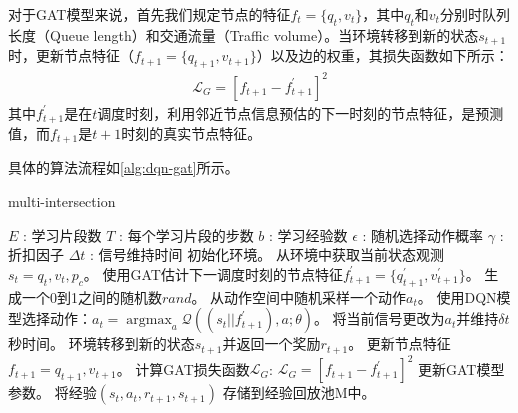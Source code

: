 对于GAT模型来说，首先我们规定节点的特征$f_t=\{q_t, v_t\}$，其中$q_t$和$v_t$分别时队列长度（Queue length）和交通流量（Traffic volume）。当环境转移到新的状态$s_{t+1}$时，更新节点特征（$f_{t+1}=\{q_{t+1},v_{t+1}\}$）以及边的权重，其损失函数如下所示：
\begin{align}
  \label{eq:loss-gat}
  \mathcal{L}_G = [f_{t+1} - f_{t+1}^{\prime}]^2
\end{align}
其中$f_{t+1}^{\prime}$是在$t$调度时刻，利用邻近节点信息预估的下一时刻的节点特征，是预测值，而$f_{t+1}$是$t+1$时刻的真实节点特征。

具体的算法流程如\autoref{alg:dqn-gat}所示。
\begin{breakablealgorithm}
  \caption{multi-intersection}
  \label{alg:dqn-gat}
  \begin{algorithmic}[1] %
      \Require 
      $E$ : 学习片段数 \newline
      $T$ : 每个学习片段的步数 \newline
      $b$ : 学习经验数 \newline
      $\epsilon$ : 随机选择动作概率 \newline
      $\gamma$ : 折扣因子 \newline
      $\Delta t$ : 信号维持时间
          \State 初始化环境。
              \State 从环境中获取当前状态观测$s_t={q_t, v_t, p_c}$。
              \State 使用GAT估计下一调度时刻的节点特征$f_{t+1}^{\prime}=\{q_{t+1}^{\prime},v_{t+1}^{\prime}\}$。
              \State 生成一个0到1之间的随机数$rand$。
                  \State 从动作空间中随机采样一个动作$a_t$。
              \Else
                  \State 使用DQN模型选择动作：$a_t = \mathop{\arg\max}_a \mathcal{Q}((s_t||f_{t+1}^{\prime}),a;\theta)$。
              \EndIf
              \State 将当前信号更改为$a_t$并维持$\delta t$秒时间。
              \State 环境转移到新的状态$s_{t+1}$并返回一个奖励$r_{t+1}$。
              \State 更新节点特征$f_{t+1}={q_{t+1}, v_{t+1}}$。
              \State 计算GAT损失函数$\mathcal{L}_G$:
              $\mathcal{L}_G = [f_{t+1} - f_{t+1}^{\prime}]^2$
              \State 更新GAT模型参数。
              \State 将经验$(s_t,a_t,r_{t+1},s_{t+1})$ 存储到经验回放池M中。
              \EndIf
          \EndFor
      \EndFor  
  \end{algorithmic}  
\end{breakablealgorithm}  

